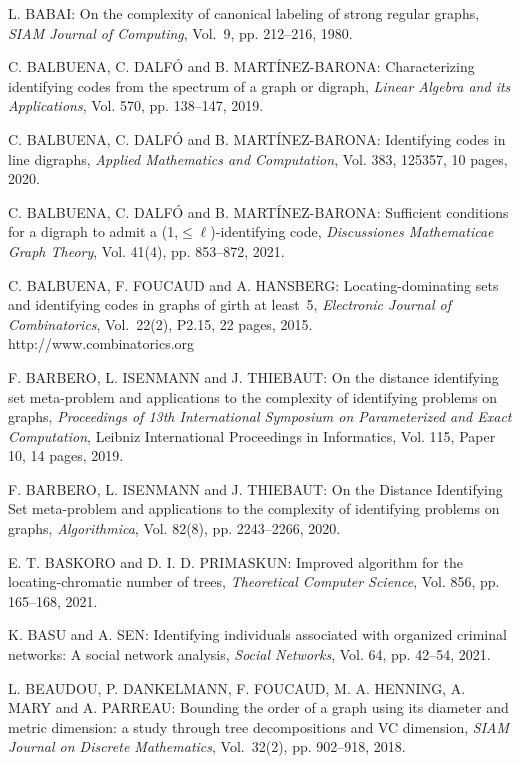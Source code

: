 \begin{thebibliography}{999}
L. BABAI: On the complexity of canonical labeling of strong regular graphs, {\it SIAM Journal of Computing}, Vol.~9, pp. 212--216, 1980.

C. BALBUENA, C. DALF\'O and B. MART\'INEZ-BARONA: Characterizing identifying codes from the spectrum of a graph or digraph, {\it Linear Algebra and its Applications}, Vol. 570, pp. 138--147, 2019.

C. BALBUENA, C. DALF\'O and B. MART\'INEZ-BARONA: Identifying codes in line digraphs, {\it Applied Mathematics and Computation}, Vol. 383, 125357, 10 pages, 2020.

C. BALBUENA, C. DALF\'O and B. MART\'INEZ-BARONA: Sufficient conditions for a digraph to admit a (1,$\leq \ell$)-identifying code, {\it Discussiones Mathematicae Graph Theory}, Vol. 41(4), pp. 853--872, 2021.

C. BALBUENA, F. FOUCAUD and A. HANSBERG: Locating-dominating sets and identifying codes in graphs of girth at least~5, {\it Electronic Journal of Combinatorics}, Vol.~22(2), P2.15, 22 pages, 2015.\\
http://www.combinatorics.org

F. BARBERO, L. ISENMANN and J. THIEBAUT: On the distance identifying set meta-problem and applications to the complexity of identifying problems on graphs, {\it Proceedings of 13th International Symposium on Parameterized and Exact Computation}, Leibniz International Proceedings in Informatics, Vol. 115, Paper 10, 14 pages, 2019.

F. BARBERO, L. ISENMANN and J. THIEBAUT: On the Distance Identifying Set meta-problem and applications to the complexity of identifying problems on graphs, {\it Algorithmica}, Vol. 82(8), pp. 2243--2266, 2020.

E. T. BASKORO and D. I. D. PRIMASKUN: Improved algorithm for the locating-chromatic number of trees, {\it Theoretical Computer Science}, Vol. 856, pp. 165--168, 2021.

K. BASU and A. SEN: Identifying individuals associated with organized criminal networks: A social network analysis, {\it Social Networks}, Vol. 64, pp. 42--54, 2021.

L. BEAUDOU, P. DANKELMANN, F. FOUCAUD, M. A. HENNING, A. MARY and A. PARREAU: Bounding the order of a graph using its diameter and metric dimension: a study through tree decompositions and VC dimension, {\it SIAM Journal on Discrete Mathematics}, Vol.~32(2), pp. 902--918, 2018.


\end{thebibliography}
